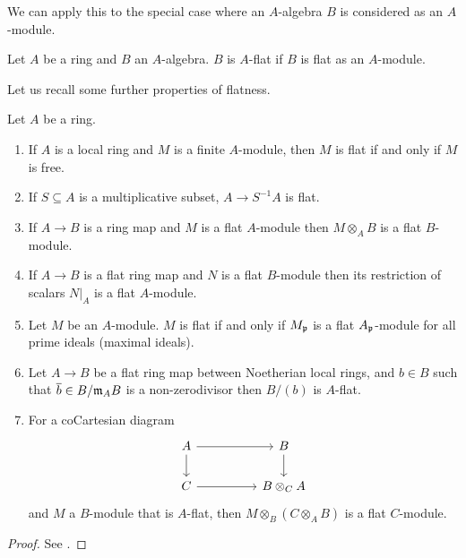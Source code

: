 We can apply this to the special case where an $A$-algebra $B$ is considered as an $A$-module. 
\begin{definition}\label{def: flat algebra}
    Let $A$ be a ring and $B$ an $A$-algebra. $B$ is $A$-flat if $B$ is flat as an $A$-module. 
\end{definition}
Let us recall some further properties of flatness. 
\begin{proposition}\label{prop: properties of flatness rings and modules}
    Let $A$ be a ring. 
    \begin{enumerate}[label=(\roman*)]
        \item If $A$ is a local ring and $M$ is a finite $A$-module, then $M$ is flat if and only if $M$ is free. 
        \item If $S\subseteq A$ is a multiplicative subset, $A\to S^{-1}A$ is flat. 
        \item If $A\to B$ is a ring map and $M$ is a flat $A$-module then $M\otimes_{A}B$ is a flat $B$-module. 
        \item If $A\to B$ is a flat ring map and $N$ is a flat $B$-module then its restriction of scalars $N|_{A}$ is a flat $A$-module. 
        \item Let $M$ be an $A$-module. $M$ is flat if and only if $M_{\mathfrak{p}}$ is a flat $A_{\mathfrak{p}}$-module for all prime ideals (maximal ideals). 
        \item Let $A\to B$ be a flat ring map between Noetherian local rings, and $b\in B$ such that $\overline{b}\in B/\mathfrak{m}_{A}B$ is a non-zerodivisor then $B/(b)$ is $A$-flat. 
        \item For a coCartesian diagram 
        $$%
        \begin{tikzcd}
            A && B \\
            C && {B\otimes_{C}A}
            \arrow[from=1-1, to=1-3]
            \arrow[from=1-1, to=2-1]
            \arrow[from=1-3, to=2-3]
            \arrow[from=2-1, to=2-3]
        \end{tikzcd}$$
        and $M$ a $B$-module that is $A$-flat, then $M\otimes_{B}(C\otimes_{A}B)$ is a flat $C$-module. 
    \end{enumerate}
\end{proposition}
\begin{proof}
    See \cite[\href{https://stacks.math.columbia.edu/tag/00H9}{Tag 00H9}]{stacks-project}.
\end{proof}
